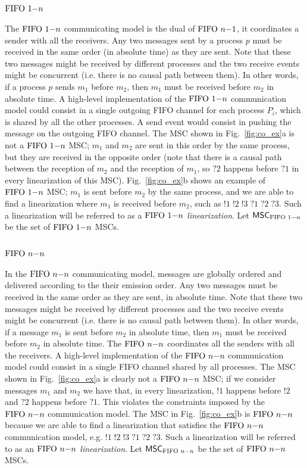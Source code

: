 \subsection{$\text{FIFO } 1\mathsf{-}n$}
The $\text{FIFO } 1\mathsf{-}n$ communicating model is the dual of $\text{FIFO } n\mathsf{-}1$, it coordinates a sender with all the receivers. Any two messages sent by a process $p$ must be received in the same order (in absolute time) as they are sent. Note that these two messages might be received by different processes and the two receive events might be concurrent (i.e. there is no causal path between them). In other words, if a process $p$ sends $m_1$ before $m_2$, then $m_1$ must be received before $m_2$ in absolute time. A high-level implementation of the $\text{FIFO } 1\mathsf{-}n$ communication model could consist in a single outgoing FIFO channel for each process $P_i$, which is shared by all the other processes. A send event would consist in pushing the message on the outgoing FIFO channel. The MSC shown in Fig.~\ref{fig:co_ex}a is not a $\text{FIFO } 1\mathsf{-}n$ MSC; $m_1$ and $m_2$ are sent in this order by the same process, but they are received in the opposite order (note that there is a causal path between the reception of $m_2$ and the reception of $m_1$, so $?2$ happens before $?1$ in every linearization of this MSC). Fig.~\ref{fig:co_ex}b shows an example of $\text{FIFO } 1\mathsf{-}n$ MSC; $m_1$ is sent before $m_2$ by the same process, and we are able to find a linearization where $m_1$ is received before $m_2$, such as $!1\;!2\;!3\;?1\;?2\;?3$. Such a linearization will be referred to as a \emph{$\text{FIFO } 1\mathsf{-}n$ linearization}. Let $\mathsf{MSC}_{\text{FIFO } 1\mathsf{-}n}$ be the set of $\text{FIFO } 1\mathsf{-}n$ MSCs.

\subsection{$\text{FIFO } n\mathsf{-}n$}
In the $\text{FIFO } n\mathsf{-}n$ communicating model, messages are globally ordered and delivered according to the their emission order. Any two messages must be received in the same order as they are sent, in absolute time. Note that these two messages might be received by different processes and the two receive events might be concurrent (i.e. there is no causal path between them). In other words, if a message $m_1$ is sent before $m_2$ in absolute time, then $m_1$ must be received before $m_2$ in absolute time. The $\text{FIFO } n\mathsf{-}n$ coordinates all the senders with all the receivers. A high-level implementation of the $\text{FIFO } n\mathsf{-}n$ communication model could consist in a single FIFO channel shared by all processes. The MSC shown in Fig.~\ref{fig:co_ex}a is clearly not a $\text{FIFO } n\mathsf{-}n$ MSC; if we consider messages $m_1$ and $m_2$ we have that, in every linearization, $!1$ happens before $!2$ and $?2$ happens before $?1$. This violates the constraints imposed by the $\text{FIFO } n\mathsf{-}n$ communication model. The MSC in Fig.~\ref{fig:co_ex}b is $\text{FIFO } n\mathsf{-}n$ because we are able to find a linearization that satisfies the $\text{FIFO } n\mathsf{-}n$ communication model, e.g. $!1\;!2\;!3\;?1\;?2\;?3$. Such a linearization will be referred to as an \emph{$\text{FIFO } n\mathsf{-}n$ linearization}. Let $\mathsf{MSC}_{\text{FIFO } n\mathsf{-}n}$ be the set of $\text{FIFO } n\mathsf{-}n$ MSCs.

